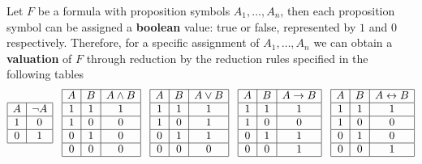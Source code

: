 \documentclass[11pt]{book}
\begin{document}
Let $F$ be a formula with proposition symbols $A_1,\dots,A_n$, then each proposition symbol can be assigned a \textbf{boolean} value: true or false, represented by $1$ and $0$ respectively. Therefore, for a specific assignment of $A_1,\dots,A_n$ we can obtain a \textbf{valuation} of $F$ through reduction by the reduction rules specified in the following tables
\[
\begin{array}{|c|c|}
\hline A & \neg A \\ 
\hline 1 & 0 \\ 
\hline 0 & 1 \\ 
\hline
\end{array}
\hspace{3mm}
\begin{array}{|c|c|c|}
\hline A & B & A\land B \\
\hline 1 & 1 & 1 \\
\hline 1 & 0 & 0 \\
\hline 0 & 1 & 0 \\
\hline 0 & 0 & 0 \\
\hline
\end{array}
\hspace{3mm}
\begin{array}{|c|c|c|}
\hline A & B & A\lor B \\
\hline 1 & 1 & 1 \\
\hline 1 & 0 & 1 \\
\hline 0 & 1 & 1 \\
\hline 0 & 0 & 0 \\
\hline
\end{array}
\hspace{3mm}
\begin{array}{|c|c|c|}
\hline A & B & A\rightarrow B \\
\hline 1 & 1 & 1 \\
\hline 1 & 0 & 0 \\
\hline 0 & 1 & 1 \\
\hline 0 & 0 & 1 \\
\hline
\end{array}
\hspace{3mm}
\begin{array}{|c|c|c|}
\hline A & B & A\leftrightarrow B \\
\hline 1 & 1 & 1 \\
\hline 1 & 0 & 0 \\
\hline 0 & 1 & 0 \\
\hline 0 & 0 & 1 \\
\hline
\end{array}
\]
\end{document}
